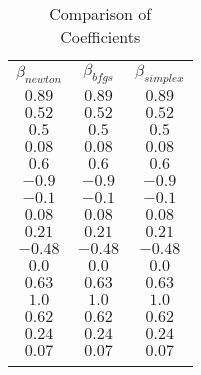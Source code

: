 \begin{table}[!b]
    \centering \small
    \caption{Comparison of Coefficients}
    \begin{tabular}{ccc}
    \par \toprule 
    $\beta_{newton}$ & $\beta_{bfgs}$ & $\beta_{simplex}$\\
    \par \midrule
    $0.89$ & $0.89$ & $0.89$\\
    $0.52$ & $0.52$ & $0.52$\\
    $0.5$ & $0.5$ & $0.5$\\
    $0.08$ & $0.08$ & $0.08$\\
    $0.6$ & $0.6$ & $0.6$\\
    $-0.9$ & $-0.9$ & $-0.9$\\
    $-0.1$ & $-0.1$ & $-0.1$\\
    $0.08$ & $0.08$ & $0.08$\\
    $0.21$ & $0.21$ & $0.21$\\
    $-0.48$ & $-0.48$ & $-0.48$\\
    $0.0$ & $0.0$ & $0.0$\\
    $0.63$ & $0.63$ & $0.63$\\
    $1.0$ & $1.0$ & $1.0$\\
    $0.62$ & $0.62$ & $0.62$\\
    $0.24$ & $0.24$ & $0.24$\\
    $0.07$ & $0.07$ & $0.07$\\
    \par \toprule
    \end{tabular}
\label{tab1}
\end{table}